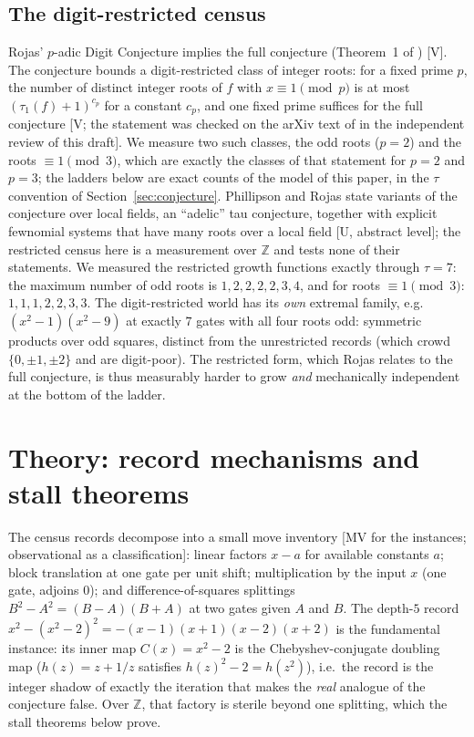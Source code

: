 \documentclass[11pt]{article}
\theoremstyle{definition}
\theoremstyle{remark}
\newcommand{\Z}{\mathbb{Z}}
\begin{document}
\subsection{The digit-restricted census}\label{sec:digit}

Rojas' $p$-adic Digit Conjecture implies the full conjecture (Theorem~1 of
\cite{Rojas2003}) [V]. The conjecture bounds a digit-restricted class of integer roots: for a
fixed prime $p$, the number of distinct integer roots of $f$ with $x \equiv 1 \pmod p$ is at most
$(\tau_1(f)+1)^{c_p}$ for a constant $c_p$, and one fixed prime suffices for the full conjecture
[V; the statement was checked on the arXiv text of \cite{Rojas2003} in the independent review of this
draft]. We measure two such classes, the odd roots ($p = 2$) and the roots $\equiv 1 \pmod 3$,
which are exactly the classes of that statement for $p = 2$ and $p = 3$; the ladders below are
exact counts of the model of this paper, in the $\tau$ convention of
Section~\ref{sec:conjecture}.
Phillipson and Rojas state variants of the conjecture over local fields, an ``adelic'' tau
conjecture, together with explicit fewnomial systems that have many roots over a local field
\cite{PhillipsonRojas2013} [U, abstract level]; the restricted census here is a measurement over
$\Z$ and tests none of their statements.
We measured the restricted growth functions exactly through
$\tau = 7$: the maximum number of odd roots is
$1, 2, 2, 2, 2, 3, 4$, and for roots $\equiv 1 \pmod 3$:
$1, 1, 1, 2, 2, 3, 3$. The digit-restricted world has its \emph{own} extremal family, e.g.
$(x^2 - 1)(x^2 - 9)$ at exactly $7$ gates with all four roots odd: symmetric
products over odd squares, distinct from the unrestricted records (which crowd
$\{0, \pm 1, \pm 2\}$ and are digit-poor). The restricted form, which Rojas relates to the
full conjecture, is thus measurably harder to grow \emph{and} mechanically independent at
the bottom of the ladder.

\section{Theory: record mechanisms and stall theorems}\label{sec:stall}\label{sec:mech}


The census records decompose into a small move inventory [MV for the instances;
observational as a classification]: linear factors $x - a$ for available constants
$a$; block translation at one gate per unit shift; multiplication by the input $x$
(one gate, adjoins $0$); and difference-of-squares splittings $B^2 - A^2 = (B-A)(B+A)$
at two gates given $A$ and $B$. The depth-$5$ record
$x^2 - (x^2 - 2)^2 = -(x{-}1)(x{+}1)(x{-}2)(x{+}2)$ is the fundamental instance: its
inner map $C(x) = x^2 - 2$ is the Chebyshev-conjugate doubling map
($h(z) = z + 1/z$ satisfies $h(z)^2 - 2 = h(z^2)$), i.e.\ the record is the integer
shadow of exactly the iteration that makes the \emph{real} analogue of the conjecture
false. Over $\Z$, that factory is sterile beyond one splitting, which the stall theorems
below prove.
\end{document}
